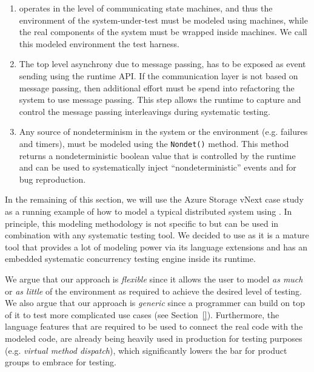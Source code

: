 \begin{enumerate}
\item \psharp operates in the level of communicating state machines, and thus the environment of the system-under-test must be modeled using \psharp machines, while the real components of the system must be wrapped inside \psharp machines. We call this modeled environment the \psharp test harness.

\item The top level asynchrony due to message passing, has to be exposed as event sending using the \psharp runtime API. If the communication layer is not based on message passing, then additional effort must be spend into refactoring the system to use message passing. This step allows the \psharp runtime to capture and control the message passing interleavings during systematic testing.

\item Any source of nondeterminism in the system or the environment (e.g. failures and timers), must be modeled using the \psharp \texttt{Nondet()} method. This method returns a nondeterministic boolean value that is controlled by the \psharp runtime and can be used to systematically inject ``nondeterministic'' events and for bug reproduction.
\end{enumerate}

In the remaining of this section, we will use the Azure Storage vNext case study as a running example of how to model a typical distributed system using \psharp. In principle, this modeling methodology is not specific to \psharp but can be used in combination with any systematic testing tool. We decided to use \psharp as it is a mature tool that provides a lot of modeling power via its \csharp language extensions and has an embedded systematic concurrency testing engine inside its runtime.

We argue that our approach is \emph{flexible} since it allows the user to model \emph{as much} or \emph{as little} of the environment as required to achieve the desired level of testing. We also argue that our approach is \emph{generic} since a programmer can build on top of it to test more complicated use cases (see Section~\ref{}). Furthermore, the language features that are required to be used to connect the real code with the modeled code, are already being heavily used in production for testing purposes (e.g. \emph{virtual method dispatch}), which significantly lowers the bar for product groups to embrace \psharp for testing.

